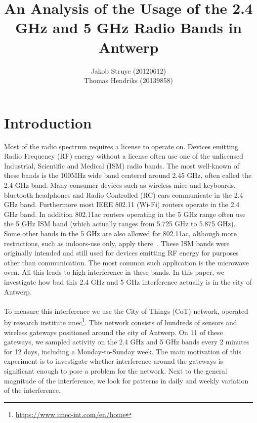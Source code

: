 \documentclass[a4paper, 11pt]{article}
\begin{document}
%
\title{An Analysis of the Usage of the 2.4 GHz and 5 GHz Radio Bands in Antwerp}


\author{
	Jakob Struye (20120612)\\
    Thomas Hendriks (20139858)\\
}

\maketitle


\tableofcontents
\clearpage

\section{Introduction}
Most of the radio spectrum requires a license to operate on. Devices emitting Radio Frequency (RF) energy without a license often use one of the unlicensed Industrial, Scientific and Medical (ISM) radio bands. The most well-known of these bands is the 100MHz wide band centered around 2.45 GHz, often called the 2.4 GHz band. Many consumer devices such as wireless mice and keyboards, bluetooth headphones and Radio Controlled (RC) cars communicate in the 2.4 GHz band. Furthermore most IEEE 802.11 (Wi-Fi) routers operate in the 2.4 GHz band. In addition 802.11ac routers operating in the 5 GHz range often use the 5 GHz ISM band (which actually ranges from 5.725 GHz to 5.875 GHz). Some other bands in the 5 GHz are also allowed for 802.11ac, although more restrictions, such as indoors-use only, apply there~\cite{50ism}. These ISM bands were originally intended and still used for devices emitting RF energy for purposes other than communication. The most common such application is the microwave oven. All this leads to high interference in these bands. In this paper, we investigate how bad this 2.4 GHz and 5 GHz interference actually is in the city of Antwerp. \\ \\
To measure this interference we use the City of Things (CoT) network, operated by research institute imec\footnote{\url{https://www.imec-int.com/en/home}}. This network consists of hundreds of sensors and wireless gateways positioned around the city of Antwerp. On 11 of these gateways, we sampled activity on the 2.4 GHz and 5 GHz bands every 2 minutes for 12 days, including a Monday-to-Sunday week. The main motivation of this experiment is to investigate whether interference around the gateways is significant enough to pose a problem for the network. Next to the general magnitude of the interference, we look for patterns in daily and weekly variation of the interference.
\end{document}
